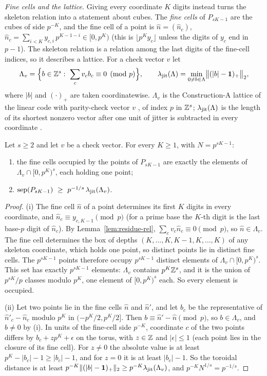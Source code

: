 \emph{Fine cells and the lattice.} Giving every coordinate $K$ digits instead turns the skeleton relation into a statement about cubes. The \emph{fine cells} of $P_{sK-1}$ are the cubes of side $p^{-K}$, and the fine cell of a point is $\hat n=(\hat n_c)$, $\hat n_c=\sum_{i<K}y_{c,i}\,p^{K-1-i}\in[0,p^K)$ (this is $\lfloor p^Ky_c\rfloor$ unless the digits of $y_c$ end in $p-1$). The skeleton relation is a relation among the last digits of the fine-cell indices, so it describes a lattice. For a check vector $v$ let
\[
\Lambda_v=\Bigl\{b\in\Z^s:\ \sum_cv_cb_c\equiv0\pmod p\Bigr\},\qquad \ljit(\Lambda)=\min_{0\ne b\in\Lambda}\bigl\|(|b|-\mathbf 1)_+\bigr\|_2,
\]
where $|b|$ and $(\cdot)_+$ are taken coordinatewise. $\Lambda_v$ is the Construction-A lattice of the linear code with parity-check vector $v$ \cite[Ch.~5]{CS99}, of index $p$ in $\mathbb{Z}^s$; $\lambda_{\mathrm{jit}}(\Lambda)$ is the length of its shortest nonzero vector after one unit of jitter is subtracted in every coordinate \cite{Gru26geo}%
.

\begin{theorem}\label{thm:residue}
Let $s\ge2$ and let $v$ be a check vector. For every $K\ge1$, with $N=p^{sK-1}$:
\begin{enumerate}
\item[(i)] the fine cells occupied by the points of $P_{sK-1}$ are exactly the elements of $\Lambda_v\cap[0,p^K)^s$, each holding one point;
\item[(ii)] $\sep{P_{sK-1}}\ \ge\ p^{-1/s}\,\ljit(\Lambda_v)$.
\end{enumerate}
\end{theorem}

\begin{proof}
(i) The fine cell $\hat n$ of a point determines its first $K$ digits in every coordinate, and $\hat n_c\equiv y_{c,K-1}\pmod p$ (for a prime base the $K$-th digit is the last base-$p$ digit of $\hat n_c$). By Lemma~\ref{lem:residue-rel}, $\sum_cv_c\hat n_c\equiv0\pmod p$, so $\hat n\in\Lambda_v$. The fine cell determines the box of depths $(K,\dots,K,K-1,K,\dots,K)$ of any skeleton coordinate, which holds one point, so distinct points lie in distinct fine cells. The $p^{sK-1}$ points therefore occupy $p^{sK-1}$ distinct elements of $\Lambda_v\cap[0,p^K)^s$. This set has exactly $p^{sK-1}$ elements: $\Lambda_v$ contains $p^K\mathbb{Z}^s$, and it is the union of $p^{sK}/p$ classes modulo $p^K$, one element of $[0,p^K)^s$ each. So every element is occupied.

(ii) Let two points lie in the fine cells $\hat n$ and $\hat n'$, and let $b_c$ be the representative of $\hat n'_c-\hat n_c$ modulo $p^K$ in $(-p^K/2,p^K/2]$. Then $b\equiv\hat n'-\hat n\pmod p$, so $b\in\Lambda_v$, and $b\ne0$ by (i). In units of the fine-cell side $p^{-K}$, coordinate $c$ of the two points differs by $b_c+zp^K+\epsilon$ on the torus, with $z\in\mathbb{Z}$ and $|\epsilon|\le1$ (each point lies in the closure of its fine cell). For $z\ne0$ the absolute value is at least $p^K-|b_c|-1\ge|b_c|-1$, and for $z=0$ it is at least $|b_c|-1$. So the toroidal distance is at least $p^{-K}\|(|b|-\mathbf 1)_+\|_2\ge p^{-K}\lambda_{\mathrm{jit}}(\Lambda_v)$, and $p^{-K}N^{1/s}=p^{-1/s}$.
\end{proof}

